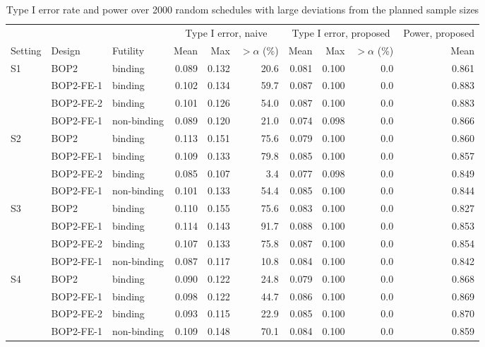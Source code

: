 \begin{table}
\centering
\caption{Type I error rate and power over 2000 random schedules with large deviations from the planned sample sizes}
\label{tab:large}
\scriptsize
\setlength{\tabcolsep}{3pt}
\begin{tabular}{lllrrrrrrr}
\toprule
 & & & \multicolumn{3}{c}{Type I error, naive} & \multicolumn{3}{c}{Type I error, proposed} & Power, proposed \\
\cmidrule(lr){4-6}\cmidrule(lr){7-9}
Setting & Design & Futility & Mean & Max & $>\alpha$ (\%) & Mean & Max & $>\alpha$ (\%) & Mean \\
\midrule
S1 & BOP2 & binding & 0.089 & 0.132 & 20.6 & 0.081 & 0.100 & 0.0 & 0.861 \\
 & BOP2-FE-1 & binding & 0.102 & 0.134 & 59.7 & 0.087 & 0.100 & 0.0 & 0.883 \\
 & BOP2-FE-2 & binding & 0.101 & 0.126 & 54.0 & 0.087 & 0.100 & 0.0 & 0.883 \\
 & BOP2-FE-1 & non-binding & 0.089 & 0.120 & 21.0 & 0.074 & 0.098 & 0.0 & 0.866 \\
\midrule
S2 & BOP2 & binding & 0.113 & 0.151 & 75.6 & 0.079 & 0.100 & 0.0 & 0.860 \\
 & BOP2-FE-1 & binding & 0.109 & 0.133 & 79.8 & 0.085 & 0.100 & 0.0 & 0.857 \\
 & BOP2-FE-2 & binding & 0.085 & 0.107 & 3.4 & 0.077 & 0.098 & 0.0 & 0.849 \\
 & BOP2-FE-1 & non-binding & 0.101 & 0.133 & 54.4 & 0.085 & 0.100 & 0.0 & 0.844 \\
\midrule
S3 & BOP2 & binding & 0.110 & 0.155 & 75.6 & 0.083 & 0.100 & 0.0 & 0.827 \\
 & BOP2-FE-1 & binding & 0.114 & 0.143 & 91.7 & 0.088 & 0.100 & 0.0 & 0.853 \\
 & BOP2-FE-2 & binding & 0.107 & 0.133 & 75.8 & 0.087 & 0.100 & 0.0 & 0.854 \\
 & BOP2-FE-1 & non-binding & 0.087 & 0.117 & 10.8 & 0.084 & 0.100 & 0.0 & 0.842 \\
\midrule
S4 & BOP2 & binding & 0.090 & 0.122 & 24.8 & 0.079 & 0.100 & 0.0 & 0.868 \\
 & BOP2-FE-1 & binding & 0.098 & 0.122 & 44.7 & 0.086 & 0.100 & 0.0 & 0.869 \\
 & BOP2-FE-2 & binding & 0.093 & 0.115 & 22.9 & 0.085 & 0.100 & 0.0 & 0.870 \\
 & BOP2-FE-1 & non-binding & 0.109 & 0.148 & 70.1 & 0.084 & 0.100 & 0.0 & 0.859 \\
\midrule

\end{tabular}
\end{table}
